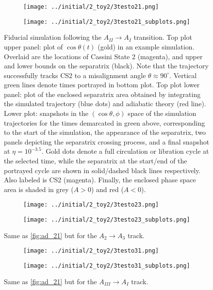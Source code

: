 \documentclass[
        fleqn,
        usenatbib,
    ]{mnras}
\newcommand*{\p}[1]{\left(#1\right)}
\begin{document}
\begin{figure}
    \centering
    \begin{subfigure}{\columnwidth}
        \centering
        \texttt{[image: ../initial/2\_toy2/3testo21.png]}
    \end{subfigure}
    \begin{subfigure}{\columnwidth}
        \centering
        \texttt{[image: ../initial/2\_toy2/3testo21\_subplots.png]}
    \end{subfigure}
    \caption{Fiducial simulation following the $A_{II} \to A_{I}$ transition.
    Top plot upper panel: plot of $\cos \theta(t)$ (gold) in an example
    simulation. Overlaid are the locations of Cassini State 2 (magenta), and
    upper and lower bounds on the separatrix (black). Note that the trajectory
    successfully tracks CS2 to a misalignment angle $\theta \approx 90^\circ$.
    Vertical green lines denote times portrayed in bottom plot. Top plot lower
    panel: plot of the enclosed separatrix area obtained by integrating the
    simulated trajectory (blue dots) and adiabatic theory (red line). Lower
    plot: snapshots in the $\p{\cos \theta, \phi}$ space of the simulation
    trajectories for the times demarcated in green above, corresponding to the
    start of the simulation, the appearance of the separatrix, two panels
    depicting the separatrix crossing process, and a final snapshot at $\eta =
    10^{-3.5}$. Gold dots denote a full circulation or libration cycle at the
    selected time, while the separatrix at the start/end of the portrayed cycle
    are shown in solid/dashed black lines respectively. Also labeled is CS2
    (magenta). Finally, the enclosed phase space area is shaded in grey ($A >
    0$) and red ($A < 0$).}\label{fig:ad_21}
\end{figure}
\begin{figure}
    \centering
    \begin{subfigure}{\columnwidth}
        \centering
        \texttt{[image: ../initial/2\_toy2/3testo23.png]}
    \end{subfigure}
    \begin{subfigure}{\columnwidth}
        \centering
        \texttt{[image: ../initial/2\_toy2/3testo23\_subplots.png]}
    \end{subfigure}
    \caption{Same as \autoref{fig:ad_21} but for the $A_2 \to A_3$ track.
    }\label{fig:ad_23}
\end{figure}
\begin{figure}
    \centering
    \begin{subfigure}{\columnwidth}
        \centering
        \texttt{[image: ../initial/2\_toy2/3testo31.png]}
    \end{subfigure}
    \begin{subfigure}{\columnwidth}
        \centering
        \texttt{[image: ../initial/2\_toy2/3testo31\_subplots.png]}
    \end{subfigure}
    \caption{Same as \autoref{fig:ad_21} but for the $A_{III} \to A_I$
    track.}\label{fig:ad_31}
\end{figure}
\end{document}

